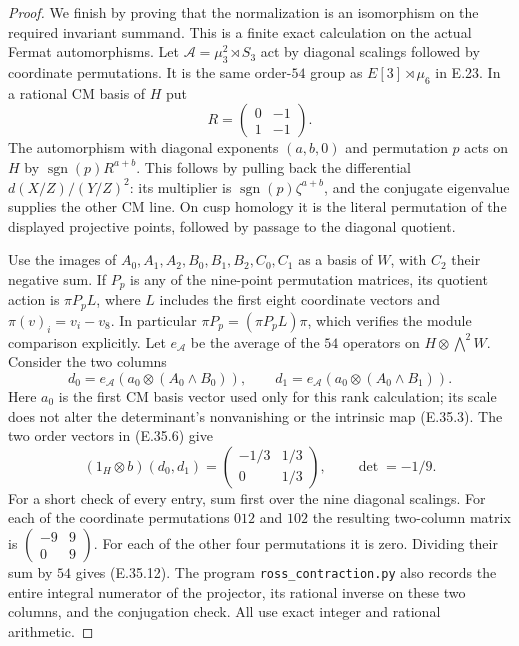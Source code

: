 \documentclass[11pt,oneside]{article}
\begin{document}
\begin{proof}
We finish by proving that the normalization
is an isomorphism on the required invariant
summand. This is a finite exact calculation
on the actual Fermat automorphisms. Let
$\mathcal A=\mu_3^2\rtimes S_3$ act by
diagonal scalings followed by coordinate
permutations. It is the same order-$54$ group
as $E[3]\rtimes\mu_6$ in E.23. In a rational
CM basis of $H$ put
\[
 R=\begin{pmatrix}0&-1\\1&-1\end{pmatrix}.
\]
The automorphism with diagonal exponents
$(a,b,0)$ and permutation $p$ acts on $H$ by
$\operatorname{sgn}(p)R^{a+b}$. This follows
by pulling back the differential
$d(X/Z)/(Y/Z)^2$: its multiplier is
$\operatorname{sgn}(p)\zeta^{a+b}$, and the
conjugate eigenvalue supplies the other CM
line. On cusp homology it is the literal
permutation of the displayed projective
points, followed by passage to the diagonal
quotient.

Use the images of
$A_0,A_1,A_2,B_0,B_1,B_2,C_0,C_1$ as a basis
of $W$, with $C_2$ their negative sum. If $P_p$
is any of the nine-point permutation matrices,
its quotient action is $\pi P_p L$, where
$L$ includes the first eight coordinate vectors
and $\pi(v)_i=v_i-v_8$. In particular
$\pi P_p=(\pi P_pL)\pi$, which verifies the
module comparison explicitly.
Let $e_{\mathcal A}$ be the average of the
$54$ operators on $H\otimes\bigwedge^2W$.
Consider the two columns
\[
 d_0=e_{\mathcal A}(a_0\otimes(A_0\wedge B_0)),
 \qquad
 d_1=e_{\mathcal A}(a_0\otimes(A_0\wedge B_1)).
\]
Here $a_0$ is the first CM basis vector used
only for this rank calculation; its scale does
not alter the determinant's nonvanishing or
the intrinsic map (E.35.3). The two order vectors
in (E.35.6) give
\[
 (1_H\otimes b)(d_0,d_1)=
     \begin{pmatrix}-1/3&1/3\\0&1/3\end{pmatrix},
 \qquad \det=-1/9.
 \tag{E.35.12}
\]
For a short check of every entry, sum first
over the nine diagonal scalings. For each of
the coordinate permutations $012$ and $102$
the resulting two-column matrix is
$\left(\begin{smallmatrix}-9&9\\0&9\end{smallmatrix}\right)$.
For each of the other four permutations it
is zero. Dividing their sum by $54$ gives
(E.35.12). The program
\texttt{ross\_contraction.py} also records the
entire integral numerator of the projector,
its rational inverse on these two columns,
and the conjugation check. All use exact
integer and rational arithmetic.


\end{proof}
\end{document}

